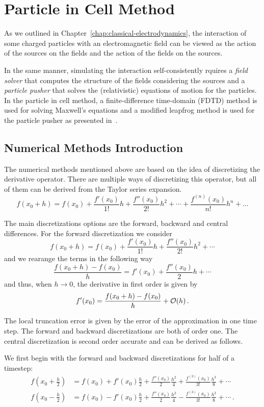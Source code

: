 \documentclass[12pt, class=report, crop=false]{standalone}
\begin{document}
\chapter{Particle in Cell Method}%
\label{chap:pic}

As we outlined in Chapter~\ref{chap:classical-electrodynamics}, the interaction
of some charged particles with an electromagnetic field can be viewed as the
action of the sources on the fields and the action of the fields on the sources.

In the same manner, simulating the interaction self-consistently rquires a
\emph{field solver} that computes the structure of the fields considering
the sources and a \emph{particle pusher} that solves the (relativistic)
equations of motion for the particles.
In the particle in cell method, a finite-difference time-domain (FDTD) method
is used for solving Maxwell's equations and a modified leapfrog method is used
for the particle pusher as presented in~\cite{arber_contemporaryparticleincell_2015}.

\section{Numerical Methods Introduction}

The numerical methods mentioned above are based on the idea of discretizing the
derivative operator. There are multiple ways of discretizing this operator,
but all of them can be derived from the Taylor series expansion.
\[
  f(x_0+h) = f(x_0) + \frac{f'(x_0)}{1!}h + \frac{f''(x_0)}{2!}h^2 + \dotsb + \frac{f^{(n)}(x_0)}{n!}h^n + \dots
\]

The main discretizations options are the forward, backward and central differences.
For the forward discretization we consider
\[
  f(x_0+h) = f(x_0) + \frac{f'(x_0)}{1!}h + \frac{f''(x_0)}{2!}h^2 + \dotsb
\]
and we rearange the terms in the following way
\[
  \frac{f(x_0+h) - f(x_0)}{h} = f'(x_0) + \frac{f''(x_0)}{2}h + \dotsb
\]
and thus, when \(h \to 0\), the derivative in first order is given by
\[
  f'(x_0) = \frac{f(x_0+h) - f(x_0)}{h} + \order{h}\,.
\]

The local truncation error is given by the error of the approximation in one time
step. The forward and backward discretizations are both of order one. The
central discretization is second order accurate and can be derived as follows.

We first begin with the forward and backward discretizations for half of a
timestep:
\begin{align*}
  f(x_0+\frac{h}{2}) &= f(x_0) + f'(x_0)\frac{h}{2} + \frac{f''(x_0)}{2}\frac{h^2}{4}
    + \frac{f^{(3)}(x_0)}{3!}\frac{h^3}{8} + \dotsb \\
  f(x_0-\frac{h}{2}) &= f(x_0) - f'(x_0)\frac{h}{2} + \frac{f''(x_0)}{2}\frac{h^2}{4}
    - \frac{f^{(3)}(x_0)}{3!}\frac{h^3}{8} + \dotsb \,.
\end{align*}
\end{document}
